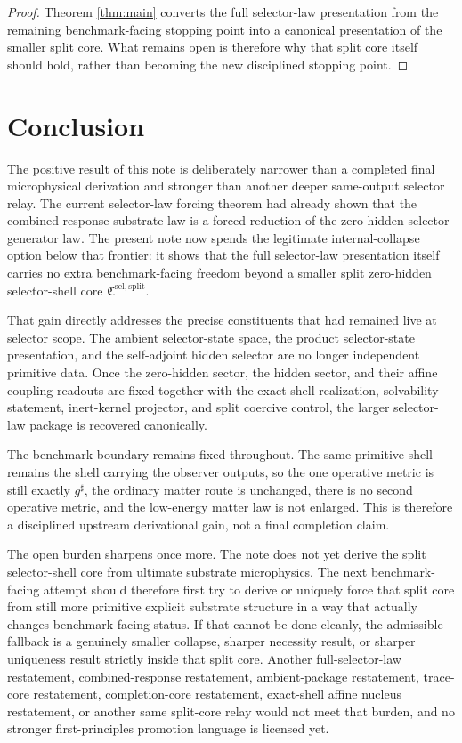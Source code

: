 \documentclass[11pt]{article}
\newcommand{\CompletedMetric}{g^{\sharp}}
\newcommand{\SelectorCore}{\mathfrak C^{\mathrm{sel,split}}}
\begin{document}
\begin{proof}
Theorem \ref{thm:main} converts the full selector-law presentation from the remaining benchmark-facing stopping point into a canonical presentation of the smaller split core. What remains open is therefore why that split core itself should hold, rather than becoming the new disciplined stopping point.
\end{proof}

\section{Conclusion}

The positive result of this note is deliberately narrower than a completed final microphysical derivation and stronger than another deeper same-output selector relay. The current selector-law forcing theorem had already shown that the combined response substrate law is a forced reduction of the zero-hidden selector generator law. The present note now spends the legitimate internal-collapse option below that frontier: it shows that the full selector-law presentation itself carries no extra benchmark-facing freedom beyond a smaller split zero-hidden selector-shell core \(\SelectorCore\).

That gain directly addresses the precise constituents that had remained live at selector scope. The ambient selector-state space, the product selector-state presentation, and the self-adjoint hidden selector are no longer independent primitive data. Once the zero-hidden sector, the hidden sector, and their affine coupling readouts are fixed together with the exact shell realization, solvability statement, inert-kernel projector, and split coercive control, the larger selector-law package is recovered canonically.

The benchmark boundary remains fixed throughout. The same primitive shell remains the shell carrying the observer outputs, so the one operative metric is still exactly \(\CompletedMetric\), the ordinary matter route is unchanged, there is no second operative metric, and the low-energy matter law is not enlarged. This is therefore a disciplined upstream derivational gain, not a final completion claim.

The open burden sharpens once more. The note does not yet derive the split selector-shell core from ultimate substrate microphysics. The next benchmark-facing attempt should therefore first try to derive or uniquely force that split core from still more primitive explicit substrate structure in a way that actually changes benchmark-facing status. If that cannot be done cleanly, the admissible fallback is a genuinely smaller collapse, sharper necessity result, or sharper uniqueness result strictly inside that split core. Another full-selector-law restatement, combined-response restatement, ambient-package restatement, trace-core restatement, completion-core restatement, exact-shell affine nucleus restatement, or another same split-core relay would not meet that burden, and no stronger first-principles promotion language is licensed yet.
\end{document}
